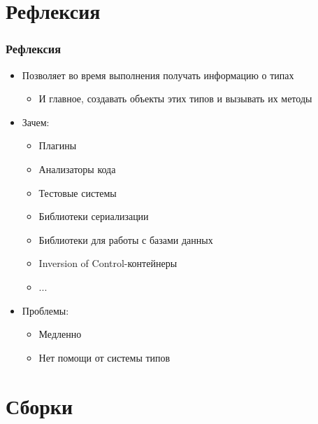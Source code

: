 \documentclass{../../slides-style}
\begin{document}
    \begin{frame}[plain]
        \titlepage
    \end{frame}

    \section{Рефлексия}

    \begin{frame}
        \frametitle{Рефлексия}
        \begin{itemize}
            \item Позволяет во время выполнения получать информацию о типах
            \begin{itemize}
                \item И главное, создавать объекты этих типов и вызывать их методы
            \end{itemize}
            \item Зачем:
            \begin{itemize}
                \item Плагины
                \item Анализаторы кода
                \item Тестовые системы
                \item Библиотеки сериализации
                \item Библиотеки для работы с базами данных
                \item Inversion of Control-контейнеры
                \item ...
            \end{itemize}
            \item Проблемы:
            \begin{itemize}
                \item Медленно
                \item Нет помощи от системы типов
            \end{itemize}
        \end{itemize}
    \end{frame}

    \section{Сборки}
\end{document}
